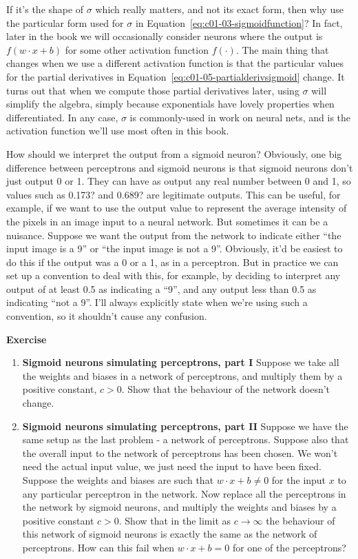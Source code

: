 If it's the shape of $\sigma$ which really matters, and not its exact form, then why use the particular form used for $\sigma$ in Equation~\ref{eq:c01-03-sigmoidfunction}? In fact, later in the book we will occasionally consider neurons where the output is $f(w \cdot x+b)$ for some other activation function $f(\cdot)$. The main thing that changes when we use a different activation function is that the particular values for the partial derivatives in Equation~\ref{eq:c01-05-partialderivsigmoid} change. It turns out that when we compute those partial derivatives later, using $\sigma$ will simplify the algebra, simply because exponentials have lovely properties when differentiated. In any case, $\sigma$ is commonly-used in work on neural nets, and is the activation function we'll use most often in this book.

How should we interpret the output from a sigmoid neuron? Obviously, one big difference between perceptrons and sigmoid neurons is that sigmoid neurons don't just output 0 or 1. They can have as output any real number between 0 and 1, so values such as 0.173? and 0.689? are legitimate outputs. This can be useful, for example, if we want to use the output value to represent the average intensity of the pixels in an image input to a neural network. But sometimes it can be a nuisance. Suppose we want the output from the network to indicate either ``the input image is a 9'' or ``the input image is not a 9''. Obviously, it'd be easiest to do this if the output was a 0 or a 1, as in a perceptron. But in practice we can set up a convention to deal with this, for example, by deciding to interpret any output of at least 0.5 as indicating a ``9'', and any output less than 0.5 as indicating ``not a 9''. I'll always explicitly state when we're using such a convention, so it shouldn't cause any confusion.

\textbf{Exercise}
\begin{enumerate}
\item \textbf{Sigmoid neurons simulating perceptrons, part I} Suppose we take all the weights and biases in a network of perceptrons, and multiply them by a positive constant, $c>0$.
Show that the behaviour of the network doesn't change.

\item \textbf{Sigmoid neurons simulating perceptrons, part II} Suppose we have the same setup as the last problem - a network of perceptrons. Suppose also that the overall input to the network of perceptrons has been chosen. We won't need the actual input value, we just need the input to have been fixed. Suppose the weights and biases are such that $w \cdot x+b \neq 0$ for the input $x$ to any particular perceptron in the network. Now replace all the perceptrons in the network by sigmoid neurons, and multiply the weights and biases by a positive constant $c>0$. Show that in the limit as $c \rightarrow \infty$ the behaviour of this network of sigmoid neurons is exactly the same as the network of perceptrons. How can this fail when $w \cdot x+b=0$ for one of the perceptrons?
\end{enumerate}
 

